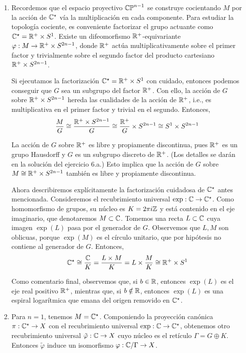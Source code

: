 \begin{solution}
\leavevmode
\begin{enumerate}[label=\alph*)]
    \item Recordemos que el espacio proyectivo $\mathbb {CP}^{n-1}$ se construye cocientando $M$ por la acción de $\mathbb C^\star$ vía la multiplicación en cada componente. Para estudiar la topología cociente, es conveniente factorizar el grupo actuante como $\mathbb C^\star = \mathbb R^+ \times S^1$. Existe un difeomorfismo $\mathbb R^+$-equivariante $\varphi : M \to \mathbb R^+ \times S^{2n-1}$, donde $\mathbb R^+$ actúa multiplicativamente sobre el primer factor y trivialmente sobre el segundo factor del producto cartesiano $\mathbb R^+ \times S^{2n-1}$.
    
    Si ejecutamos la factorización $\mathbb C^\star = \mathbb R^+ \times S^1$ con cuidado, entonces podemos conseguir que $G$ sea un subgrupo del factor $\mathbb R^+$. Con ello, la acción de $G$ sobre $\mathbb R^+ \times S^{2n-1}$ hereda las cualidades de la acción de $\mathbb R^+$, i.e., es multiplicativa en el primer factor y trivial en el segundo. Entonces,
    $$\frac MG \cong \frac {\mathbb R^+ \times S^{2n-1}} G \cong \frac {\mathbb R^+} G \times S^{2n-1} \cong S^1 \times S^{2n-1}$$
    
    La acción de $G$ sobre $\mathbb R^+$ es libre y propiamente discontinua, pues $\mathbb R^+$ es un grupo Hausdorff y $G$ es un subgrupo discreto de $\mathbb R^+$. (Los detalles se darán en la solución del ejercicio 6.a.) Esto implica que la acción de $G$ sobre $M \cong \mathbb R^+ \times S^{2n-1}$ también es libre y propiamente discontinua.
    
    Ahora describiremos explícitamente la factorización cuidadosa de $\mathbb C^\star$ antes mencionada. Consideremos el recubrimiento universal $\exp : \mathbb C \to \mathbb C^\star$. Como homomorfismo de grupos, su núcleo es $K = 2\pi i\mathbb Z$ y está contenido en el eje imaginario, que denotaremos $M \subset \mathbb C$. Tomemos una recta $L \subset \mathbb C$ cuya imagen $\exp(L)$ pasa por el generador de $G$. Observemos que $L, M$ son oblicuas, porque $\exp(M)$ es el círculo unitario, que por hipótesis no contiene al generador de $G$. Entonces,
    $$\mathbb C^\star \cong \frac {\mathbb C} K = \frac {L \times M} K = L \times \frac MK \cong \mathbb R^+ \times S^1$$
    
    Como comentario final, observemos que, si $b \in \mathbb R$, entonces $\exp(L)$ es el eje real positivo $\mathbb R^+$, mientras que, si $b \notin \mathbb R$, entonces $\exp(L)$ es una espiral logarítmica que emana del origen removido en $\mathbb C^\star$.
    
    \item Para $n = 1$, tenemos $M = \mathbb C^\star$. Componiendo la proyección canónica $\pi : \mathbb C^\star \to X$ con el recubrimiento universal $\exp : \mathbb C \to \mathbb C^\star$, obtenemos otro recubrimiento universal $\tilde \varphi : \mathbb C \to X$ cuyo núcleo es el retículo $\Gamma = G \oplus K$. Entonces $\tilde \varphi$ induce un isomorfismo $\varphi : \mathbb C/\Gamma \to X$.
    

\end{enumerate}
\end{solution}
